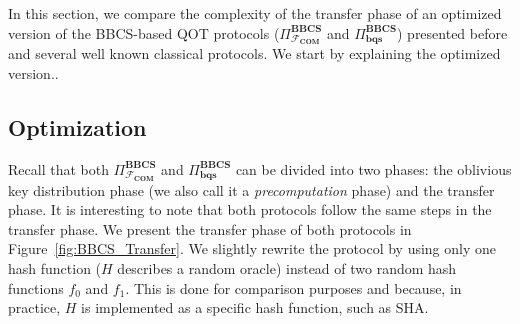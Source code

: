 In this section, we compare the complexity of the transfer phase of an optimized version of the BBCS-based QOT protocols ($\Pi^{\textbf{BBCS}}_{\mathcal{F}_{\textbf{COM}}}$ and $\Pi^{\textbf{BBCS}}_{\textbf{bqs}}$) presented before and several well known classical protocols. We start by explaining the optimized version..

\subsection{Optimization}\label{O-OT}

Recall that both $\Pi^{\textbf{BBCS}}_{\mathcal{F}_{\textbf{COM}}}$ and $\Pi^{\textbf{BBCS}}_{\textbf{bqs}}$ can be divided into two phases: the oblivious key distribution phase (we also call it a \textit{precomputation} phase) and the transfer phase. It is interesting to note that both protocols follow the same steps in the transfer phase. We present the transfer phase of both protocols in Figure~\ref{fig:BBCS_Transfer}. We slightly rewrite the protocol by using only one hash function ($H$ describes a random oracle) instead of two random hash functions $f_0$ and $f_1$. This is done for comparison purposes and because, in practice, $H$ is implemented as a specific hash function, such as SHA.

